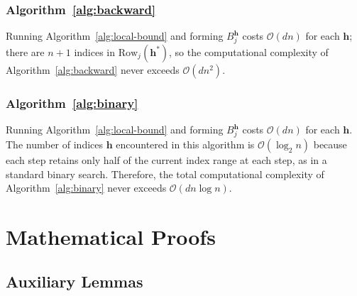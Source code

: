 \subsubsection{Algorithm~\ref{alg:backward}} \label{app:backward-backward}
Running Algorithm~\ref{alg:local-bound} and forming $B^{\mathbf{h}}_j$ costs $\mathcal{O}(dn)$ for each $\mathbf{h}$; there are $n+1$ indices in
$\mathrm{Row}_j(\mathbf{h}^*)$, so the computational complexity of Algorithm~\ref{alg:backward} never exceeds $\mathcal{O}(dn^2)$.

\subsubsection{Algorithm~\ref{alg:binary}} \label{app:backward-binary}
Running Algorithm~\ref{alg:local-bound} and forming $B^{\mathbf{h}}_j$ costs $\mathcal{O}(dn)$ for each $\mathbf{h}$. The number of indices $\mathbf{h}$ encountered in this algorithm is $\mathcal{O}(\log_2{n})$ because each step retains only half of the current index range at each step, as in a standard binary search. Therefore, the total computational complexity of Algorithm~\ref{alg:binary} never exceeds $\mathcal{O}(dn\log{n})$.

\clearpage

\section{Mathematical Proofs} 
\label{app:proofs}

\subsection{Auxiliary Lemmas}\label{app:proofs-lemmas}

